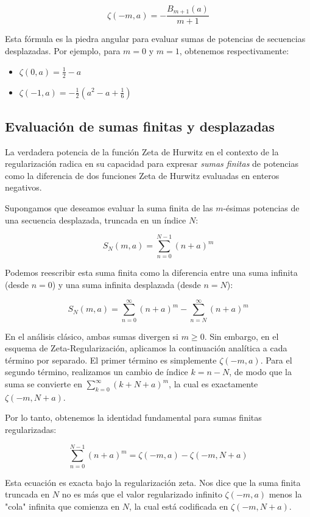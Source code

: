 $$ \zeta(-m, a) = -\frac{B_{m+1}(a)}{m+1} $$

Esta fórmula es la piedra angular para evaluar sumas de potencias de secuencias desplazadas. Por ejemplo, para $m=0$ y $m=1$, obtenemos respectivamente:

\begin{itemize}
    \item $\zeta(0, a) = \frac{1}{2} - a$
    \item $\zeta(-1, a) = -\frac{1}{2}\left(a^2 - a + \frac{1}{6}\right)$
\end{itemize}

\subsection{Evaluación de sumas finitas y desplazadas}

La verdadera potencia de la función Zeta de Hurwitz en el contexto de la regularización radica en su capacidad para expresar \textit{sumas finitas} de potencias como la diferencia de dos funciones Zeta de Hurwitz evaluadas en enteros negativos. 

Supongamos que deseamos evaluar la suma finita de las $m$-ésimas potencias de una secuencia desplazada, truncada en un índice $N$:

$$ S_N(m, a) = \sum_{n=0}^{N-1} (n+a)^m $$

Podemos reescribir esta suma finita como la diferencia entre una suma infinita (desde $n=0$) y una suma infinita desplazada (desde $n=N$):

$$ S_N(m, a) = \sum_{n=0}^{\infty} (n+a)^m - \sum_{n=N}^{\infty} (n+a)^m $$

En el análisis clásico, ambas sumas divergen si $m \ge 0$. Sin embargo, en el esquema de Zeta-Regularización, aplicamos la continuación analítica a cada término por separado. El primer término es simplemente $\zeta(-m, a)$. Para el segundo término, realizamos un cambio de índice $k = n - N$, de modo que la suma se convierte en $\sum_{k=0}^{\infty} (k + N + a)^m$, la cual es exactamente $\zeta(-m, N+a)$. 

Por lo tanto, obtenemos la identidad fundamental para sumas finitas regularizadas:

$$ \sum_{n=0}^{N-1} (n+a)^m = \zeta(-m, a) - \zeta(-m, N+a) $$

Esta ecuación es exacta bajo la regularización zeta. Nos dice que la suma finita truncada en $N$ no es más que el valor regularizado infinito $\zeta(-m, a)$ menos la "cola" infinita que comienza en $N$, la cual está codificada en $\zeta(-m, N+a)$.

